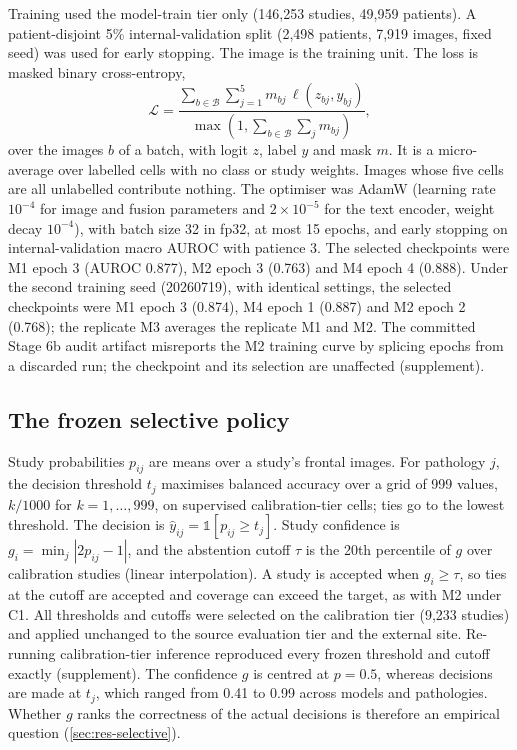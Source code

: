 Training used the model-train tier only (146,253 studies, 49,959 patients). A
patient-disjoint 5\% internal-validation split (2,498 patients, 7,919 images,
fixed seed) was used for early stopping. The image is the training unit. The
loss is masked binary cross-entropy,
\begin{equation}
\mathcal{L}=\frac{\sum_{b\in\mathcal{B}}\sum_{j=1}^{5} m_{bj}\,
\ell\!\left(z_{bj},y_{bj}\right)}{\max\!\left(1,\sum_{b\in\mathcal{B}}\sum_{j} m_{bj}\right)},
\end{equation}
over the images $b$ of a batch, with logit $z$, label $y$ and mask $m$. It is a
micro-average over labelled cells with no class or study weights. Images whose
five cells are all unlabelled contribute nothing. The optimiser was AdamW
(learning rate $10^{-4}$ for image and fusion parameters and $2\times10^{-5}$
for the text encoder, weight decay $10^{-4}$), with batch size 32 in fp32, at
most 15 epochs, and early stopping on internal-validation macro AUROC with
patience 3. The selected checkpoints were M1 epoch 3 (AUROC 0.877), M2 epoch 3
(0.763) and M4 epoch 4 (0.888). Under the second training seed (20260719), with
identical settings, the selected checkpoints were M1 epoch 3 (0.874), M4 epoch 1
(0.887) and M2 epoch 2 (0.768); the replicate M3 averages the replicate M1 and
M2. The committed Stage 6b audit artifact misreports
the M2 training curve by splicing epochs from a discarded run; the checkpoint
and its selection are unaffected (supplement).

\subsection{The frozen selective policy}
Study probabilities $p_{ij}$ are means over a study's frontal images. For
pathology $j$, the decision threshold $t_j$ maximises balanced accuracy over a
grid of 999 values, $k/1000$ for $k=1,\ldots,999$, on supervised
calibration-tier cells; ties go to the lowest threshold. The decision is
$\hat y_{ij}=\mathbb{1}[p_{ij}\ge t_j]$. Study confidence is
$g_i=\min_j|2p_{ij}-1|$, and the abstention cutoff $\tau$ is the 20th percentile
of $g$ over calibration studies (linear interpolation). A study is accepted when
$g_i\ge\tau$, so ties at the cutoff are accepted and coverage can exceed the
target, as with M2 under C1. All thresholds and cutoffs were selected on the
calibration tier (9,233 studies) and applied unchanged to the source evaluation
tier and the external site. Re-running calibration-tier inference reproduced
every frozen threshold and cutoff exactly (supplement). The confidence $g$ is
centred at $p=0.5$, whereas decisions are made at $t_j$, which ranged from
0.41 to 0.99 across models and pathologies. Whether $g$ ranks the correctness of the actual decisions is
therefore an empirical question (\cref{sec:res-selective}).

